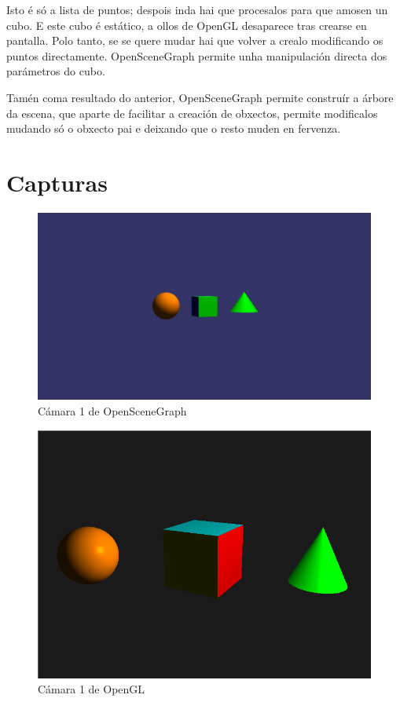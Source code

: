 \documentclass{article}
\begin{document}
Isto é só a lista de puntos; despois inda hai que procesalos para que amosen un cubo. E este cubo é estático, a ollos de OpenGL desaparece tras crearse en pantalla. Polo tanto, se se quere mudar hai que volver a crealo modificando os puntos directamente. OpenSceneGraph permite unha manipulación directa dos parámetros do cubo.

Tamén coma resultado do anterior, OpenSceneGraph permite construír a árbore da escena, que aparte de facilitar a creación de obxectos, permite modificalos mudando só o obxecto pai e deixando que o resto muden en fervenza.

\section{Capturas}

\begin{figure}[H]
\centering
\includegraphics[width=\linewidth]{1osg}
\caption{Cámara 1 de OpenSceneGraph}
\label{fig:1osg}
\end{figure}

\begin{figure}[H]
\centering
\includegraphics[width=\linewidth]{1gl}
\caption{Cámara 1 de OpenGL}
\label{fig:1gl}
\end{figure}
\end{document}
